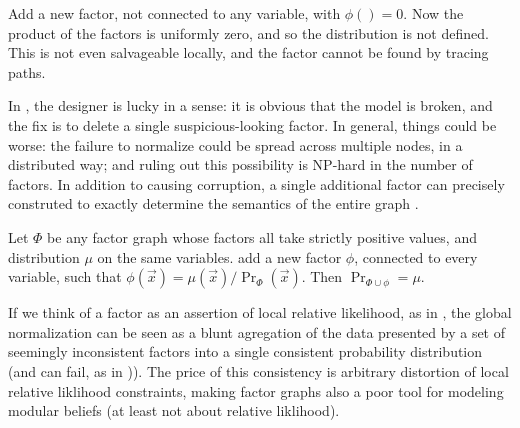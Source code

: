 \documentclass{article}
\theoremstyle{plain}
\theoremstyle{definition}
\newenvironment{example}
	{\pushQED{\qed}\renewcommand{\qedsymbol}{$\triangle$}\examplex}
	{\popQED\endexamplex%
}
\theoremstyle{remark}
\numberwithin{equation}{section}
\begin{document}
{	\begin{example}\label{ex:fg-volatile}
		Add a new factor, not connected to any variable, with $\phi() = 0$. Now the product of the factors is uniformly zero, and so the distribution is not defined. This is not even salvageable locally, and the factor cannot be found by tracing paths.  
	\end{example}


	In , the designer is lucky in a sense: it is obvious that the model is broken, and the fix is to delete a single suspicious-looking factor.
	In general, things could be  worse: the failure to normalize could be spread across multiple nodes, in a distributed way; and ruling out this possibility is NP-hard in the number of factors. 
	In addition to causing corruption, a single additional factor can precisely construted to exactly determine the semantics of the entire graph%
	.

	\begin{example}\label{ex:fg-volatile-2}
		Let $\Phi$ be any factor graph whose factors all take strictly positive values, and distribution $\mu$ on the same variables. add a new factor $\phi$, connected to every variable, such that $\phi(\vec x) = {\mu(\vec x)}/{\Pr_\Phi(\vec x)}$. Then $\Pr_{\Phi \cup \phi} = \mu$. 
	\end{example}

	If we think of a factor as an assertion of local relative likelihood, as in , the global normalization can be seen as a blunt agregation of the data presented by a set of seemingly inconsistent factors into a single consistent probability distribution (and can fail, as in )). The price of this consistency is arbitrary distortion of local relative liklihood constraints, making factor graphs also a poor tool for modeling modular beliefs (at least not about relative liklihood). 

}
\end{document}
